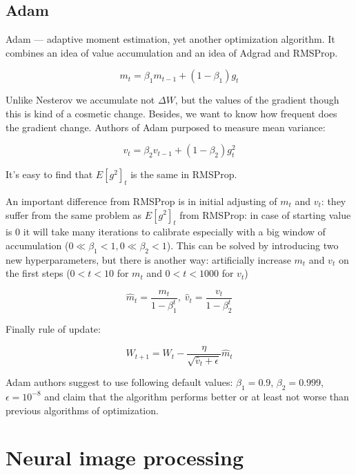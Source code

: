 \subsection{Adam}

Adam \cite{kingma_adam_2017} — adaptive moment estimation, yet another optimization algorithm. It combines an idea of value accumulation and an idea of Adgrad and RMSProp.

\begin{equation}
    m_t = \beta_1 m_{t-1} + (1 - \beta_1) g_t
\end{equation}

Unlike Nesterov we accumulate not $\Delta W$, but the values of the gradient though this is kind of a cosmetic change. Besides, we want to know how frequent does the gradient change. Authors of Adam purposed to measure mean variance:

\begin{equation}
    v_t = \beta_2 v_{t-1} + (1 - \beta_2) g_t^2
\end{equation}

It's easy to find that $E[g^2]_t$ is the same in RMSProp.

An important difference from RMSProp is in initial adjusting of $m_t$ and $v_t$: they suffer from the same problem as $E[g^2]_t$ from RMSProp: in case of starting value is $0$ it will take many iterations to calibrate especially with a big window of accumulation ($0 \ll \beta_1 < 1, 0 \ll \beta_2 < 1$). This can be solved by introducing two new hyperparameters, but there is another way: artificially increase $m_t$ and $v_t$ on the first steps ($0 < t < 10$ for $m_t$ and $0 < t < 1000$ for $v_t$)

\begin{equation}
    \hat{m}_t = \frac{m_t}{1 - \beta^t_1}, \;
    \hat{v}_t = \frac{v_t}{1 - \beta^t_2}
\end{equation}

Finally rule of update:

\begin{equation}
    W_{t+1} = W_{t} - \dfrac{\eta}{\sqrt{\hat{v}_t + \epsilon}} \hat{m}_t
\end{equation}

Adam authors suggest to use following default values: $\beta_1 = 0.9$, $\beta_2 = 0.999$, $\epsilon = 10^{-8}$ and claim that the algorithm performs better or at least not worse than previous algorithms of optimization.

\section{Neural image processing}

